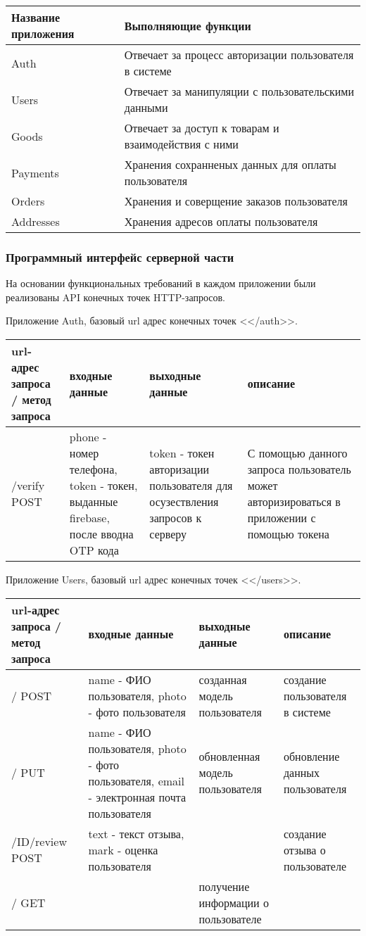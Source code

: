 \begin{longtable}{ | l | p{6cm} | }
    \hline
    Название приложения & Выполняющие функции \\ \hline
    Auth & Отвечает за процесс авторизации пользователя в системе \\ \hline
    Users & Отвечает за манипуляции с пользовательскими данными \\ \hline
    Goods & Отвечает за доступ к товарам и взаимодействия с ними \\ \hline
    Payments & Хранения сохранненых данных для оплаты пользователя\\ \hline
    Orders & Хранения и соверщение заказов пользователя \\ \hline
    Addresses & Хранения адресов оплаты пользователя \\ \hline
\end{longtable}



\subsubsection{Программный интерфейс серверной части}
На основании функциональных требований в каждом приложении были реализованы API конечных точек HTTP-запросов.

Приложение Auth, базовый url адрес конечных точек <</auth>>.

\begin{longtable}{ | p{3cm} | p{4cm} | p{3cm} | p{3cm} | }
    \hline
    url-адрес запроса / метод запроса & входные данные & выходные данные  & описание \\ \hline
   /verify POST  & phone - номер телефона, token - токен, выданные firebase, после вводна OTP кода & token - токен авторизации пользователя для осузествления запросов к серверу & С помощью данного запроса пользователь может авторизироваться в приложении с помощью токена \\ \hline
\end{longtable}

Приложение Users, базовый url адрес конечных точек <</users>>.

\begin{tabular}{ | p{3cm} | p{4cm} | p{3cm} | p{3cm} | }
    \hline
    url-адрес запроса / метод запроса & входные данные & выходные данные  & описание \\ \hline
    / POST & name - ФИО пользователя, photo - фото пользователя & созданная модель пользователя & создание пользователя в системе \\ \hline
    / PUT & name - ФИО пользователя, photo - фото пользователя, email - электронная почта пользователя & обновленная модель пользователя & обновление данных пользователя \\ \hline
    /ID/review POST & text - текст отзыва, mark - оценка пользователя & & создание отзыва о пользователе \\ \hline
    / GET & & получение информации о пользователе \\ \hline
\end{tabular}

